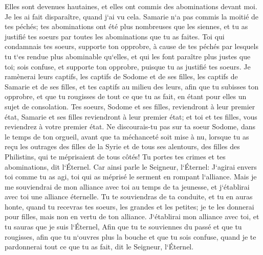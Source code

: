 \verse Elles sont devenues hautaines, et elles ont commis des abominations devant moi. Je les ai fait disparaître, quand j`ai vu cela. 
\verse Samarie n`a pas commis la moitié de tes péchés; tes abominations ont été plus nombreuses que les siennes, et tu as justifié tes soeurs par toutes les abominations que tu as faites. 
\verse Toi qui condamnais tes soeurs, supporte ton opprobre, à cause de tes péchés par lesquels tu t`es rendue plus abominable qu`elles, et qui les font paraître plus justes que toi; sois confuse, et supporte ton opprobre, puisque tu as justifié tes soeurs. 
\verse Je ramènerai leurs captifs, les captifs de Sodome et de ses filles, les captifs de Samarie et de ses filles, et tes captifs au milieu des leurs, 
\verse afin que tu subisses ton opprobre, et que tu rougisses de tout ce que tu as fait, en étant pour elles un sujet de consolation. 
\verse Tes soeurs, Sodome et ses filles, reviendront à leur premier état, Samarie et ses filles reviendront à leur premier état; et toi et tes filles, vous reviendrez à votre premier état. 
\verse Ne discourais-tu pas sur ta soeur Sodome, dans le temps de ton orgueil, 
\verse avant que ta méchanceté soit mise à nu, lorsque tu as reçu les outrages des filles de la Syrie et de tous ses alentours, des filles des Philistins, qui te méprisaient de tous côtés! 
\verse Tu portes tes crimes et tes abominations, dit l`Éternel. 
\verse Car ainsi parle le Seigneur, l`Éternel: J`agirai envers toi comme tu as agi, toi qui as méprisé le serment en rompant l`alliance. 
\verse Mais je me souviendrai de mon alliance avec toi au temps de ta jeunesse, et j`établirai avec toi une alliance éternelle. 
\verse Tu te souviendras de ta conduite, et tu en auras honte, quand tu recevras tes soeurs, les grandes et les petites; je te les donnerai pour filles, mais non en vertu de ton alliance. 
\verse J`établirai mon alliance avec toi, et tu sauras que je suis l`Éternel, 
\verse Afin que tu te souviennes du passé et que tu rougisses, afin que tu n`ouvres plus la bouche et que tu sois confuse, quand je te pardonnerai tout ce que tu as fait, dit le Seigneur, l`Éternel. 

